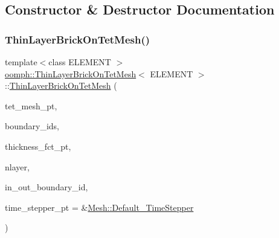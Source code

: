 \subsection{Constructor \& Destructor Documentation}
\mbox{\label{classoomph_1_1ThinLayerBrickOnTetMesh_ad452469bc94bff203012e68e80ee543c}} 
\subsubsection{\texorpdfstring{Thin\+Layer\+Brick\+On\+Tet\+Mesh()}{ThinLayerBrickOnTetMesh()}}
{\footnotesize\ttfamily template$<$class E\+L\+E\+M\+E\+NT $>$ \\
\hyperlink{classoomph_1_1ThinLayerBrickOnTetMesh}{oomph\+::\+Thin\+Layer\+Brick\+On\+Tet\+Mesh}$<$ E\+L\+E\+M\+E\+NT $>$\+::\hyperlink{classoomph_1_1ThinLayerBrickOnTetMesh}{Thin\+Layer\+Brick\+On\+Tet\+Mesh} (\begin{DoxyParamCaption}\item[{\hyperlink{classoomph_1_1Mesh}{Mesh} $\ast$}]{tet\+\_\+mesh\+\_\+pt,  }\item[{const \hyperlink{classoomph_1_1Vector}{Vector}$<$ unsigned $>$ \&}]{boundary\+\_\+ids,  }\item[{\hyperlink{classoomph_1_1ThinLayerBrickOnTetMesh_aed34f7d1e9a5c6b5f3e220cb5bdf4550}{Thickness\+Fct\+Pt}}]{thickness\+\_\+fct\+\_\+pt,  }\item[{const unsigned \&}]{nlayer,  }\item[{const \hyperlink{classoomph_1_1Vector}{Vector}$<$ \hyperlink{classoomph_1_1Vector}{Vector}$<$ unsigned $>$ $>$ \&}]{in\+\_\+out\+\_\+boundary\+\_\+id,  }\item[{\hyperlink{classoomph_1_1TimeStepper}{Time\+Stepper} $\ast$}]{time\+\_\+stepper\+\_\+pt = {\ttfamily \&\hyperlink{classoomph_1_1Mesh_a12243d0fee2b1fcee729ee5a4777ea10}{Mesh\+::\+Default\+\_\+\+Time\+Stepper}} }\end{DoxyParamCaption})}



